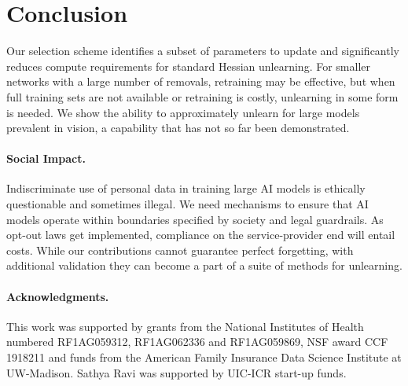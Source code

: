 \section{Conclusion}
Our selection scheme identifies a subset of parameters to update and significantly reduces compute requirements for standard Hessian unlearning. 
For smaller networks with a large number of removals, retraining may be effective, but when full training sets are not available or retraining is costly, unlearning in some form is needed. 
We show the ability to approximately unlearn for large models prevalent in vision, a capability that has not so far been demonstrated.  

\paragraph{Social Impact.} 
Indiscriminate use of personal data in training 
large AI models is ethically questionable 
and sometimes illegal. We need mechanisms to ensure that AI models operate 
within boundaries specified by society 
and legal guardrails. As opt-out laws get 
implemented, compliance on the service-provider end will entail costs. 
While our contributions cannot guarantee perfect forgetting, with additional 
validation they can become a part of a suite of methods for unlearning. 

\paragraph{Acknowledgments.}
This work was supported by grants from the National Institutes of Health numbered RF1AG059312, RF1AG062336 and RF1AG059869, NSF award CCF 1918211 and funds from the American Family Insurance Data Science Institute at UW-Madison. Sathya Ravi was supported by UIC-ICR start-up funds.

